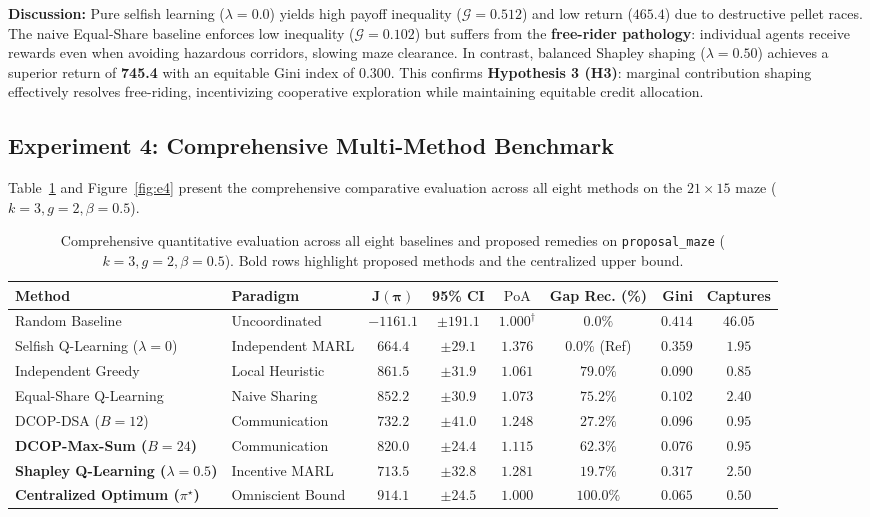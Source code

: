 \documentclass{article}
\newcommand{\PoA}{\mathrm{PoA}}
\begin{document}
\noindent\textbf{Discussion:} Pure selfish learning ($\lambda = 0.0$) yields high payoff inequality ($\mathcal{G} = 0.512$) and low return ($465.4$) due to destructive pellet races. The naive Equal-Share baseline enforces low inequality ($\mathcal{G} = 0.102$) but suffers from the \textbf{free-rider pathology}: individual agents receive rewards even when avoiding hazardous corridors, slowing maze clearance. In contrast, balanced Shapley shaping ($\lambda = 0.50$) achieves a superior return of \textbf{745.4} with an equitable Gini index of $0.300$. This confirms \textbf{Hypothesis 3 (H3)}: marginal contribution shaping effectively resolves free-riding, incentivizing cooperative exploration while maintaining equitable credit allocation.

\subsection{Experiment 4: Comprehensive Multi-Method Benchmark}
Table~\ref{tab:benchmark} and Figure~\ref{fig:e4} present the comprehensive comparative evaluation across all eight methods on the $21 \times 15$ maze ($k=3, g=2, \beta=0.5$).

\begin{table}[H]
\centering
\small
\begin{tabular}{@{}llccccrc@{}}
\toprule
\textbf{Method} & \textbf{Paradigm} & $\mathbf{J(\pi)}$ & \textbf{95\% CI} & $\mathbf{\PoA}$ & \textbf{Gap Rec. (\%)} & \textbf{Gini} & \textbf{Captures} \\
\midrule
Random Baseline & Uncoordinated & $-1161.1$ & $\pm 191.1$ & $1.000^\dagger$ & $0.0\%$ & $0.414$ & $46.05$ \\
Selfish Q-Learning ($\lambda=0$) & Independent MARL & $664.4$ & $\pm 29.1$ & $1.376$ & $0.0\%$ (Ref) & $0.359$ & $1.95$ \\
Independent Greedy & Local Heuristic & $861.5$ & $\pm 31.9$ & $1.061$ & $79.0\%$ & $0.090$ & $0.85$ \\
Equal-Share Q-Learning & Naive Sharing & $852.2$ & $\pm 30.9$ & $1.073$ & $75.2\%$ & $0.102$ & $2.40$ \\
DCOP-DSA ($B=12$) & Communication & $732.2$ & $\pm 41.0$ & $1.248$ & $27.2\%$ & $0.096$ & $0.95$ \\
\textbf{DCOP-Max-Sum ($B=24$)} & Communication & $\mathbf{820.0}$ & $\pm 24.4$ & $\mathbf{1.115}$ & $\mathbf{62.3\%}$ & $\mathbf{0.076}$ & $\mathbf{0.95}$ \\
\textbf{Shapley Q-Learning ($\lambda=0.5$)} & Incentive MARL & $\mathbf{713.5}$ & $\pm 32.8$ & $\mathbf{1.281}$ & $\mathbf{19.7\%}$ & $\mathbf{0.317}$ & $\mathbf{2.50}$ \\
\textbf{Centralized Optimum ($\pi^\star$)} & Omniscient Bound & $\mathbf{914.1}$ & $\pm 24.5$ & $\mathbf{1.000}$ & $\mathbf{100.0\%}$ & $\mathbf{0.065}$ & $\mathbf{0.50}$ \\
\bottomrule
\end{tabular}
\caption{Comprehensive quantitative evaluation across all eight baselines and proposed remedies on \texttt{proposal\_maze} ($k=3, g=2, \beta=0.5$). Bold rows highlight proposed methods and the centralized upper bound.}
\label{tab:benchmark}
\end{table}
\end{document}
